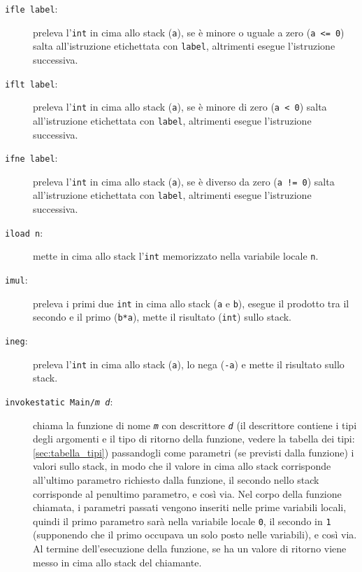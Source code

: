 \begin{description}
  \item[\texttt{ifle label}:] preleva l'\texttt{int} in cima allo stack (\texttt{a}), se \`e minore o uguale a zero (\texttt{a <= 0}) salta all'istruzione etichettata con \texttt{label}, altrimenti esegue l'istruzione successiva.

  \item[\texttt{iflt label}:] preleva l'\texttt{int} in cima allo stack (\texttt{a}), se \`e minore di zero (\texttt{a < 0}) salta all'istruzione etichettata con \texttt{label}, altrimenti esegue l'istruzione successiva.

  \item[\texttt{ifne label}:] preleva l'\texttt{int} in cima allo stack (\texttt{a}), se \`e diverso da zero (\texttt{a != 0}) salta all'istruzione etichettata con \texttt{label}, altrimenti esegue l'istruzione successiva.

  \item[\texttt{iload n}:] mette in cima allo stack l'\texttt{int} memorizzato nella variabile locale \texttt{n}.

  \item[\texttt{imul}:] preleva i primi due \texttt{int} in cima allo stack (\texttt{a} e \texttt{b}), esegue il prodotto tra il secondo e il primo (\texttt{b*a}), mette il risultato (\texttt{int}) sullo stack.

  \item[\texttt{ineg}:] preleva l'\texttt{int} in cima allo stack (\texttt{a}), lo nega (\texttt{-a}) e mette il risultato sullo stack.

  \item[\texttt{invokestatic Main/\textit{m} \textit{d}}:] chiama la funzione di nome \texttt{\textit{m}} con descrittore \texttt{\textit{d}} (il descrittore contiene i tipi degli argomenti e il tipo di ritorno della funzione, vedere la tabella dei tipi: \ref{sec:tabella_tipi}) passandogli come parametri (se previsti dalla funzione) i valori sullo stack, in modo che il valore in cima allo stack corrisponde all'ultimo parametro richiesto dalla funzione, il secondo nello stack corrisponde al penultimo parametro, e cos\`i via. Nel corpo della funzione chiamata, i parametri passati vengono inseriti nelle prime variabili locali, quindi il primo parametro sar\`a nella variabile locale \texttt{0}, il secondo in \texttt{1} (supponendo che il primo occupava un solo posto nelle variabili), e cos\`i via. Al termine dell'esecuzione della funzione, se ha un valore di ritorno viene messo in cima allo stack del chiamante.


\end{description}
